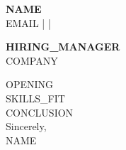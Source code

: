 \documentclass[11pt,a4paper]{article}
\begin{document}
{\Large \textbf{{{NAME}}}}\\
{{EMAIL}} \quad |  \quad | \\
\vspace{12pt}

{\bf {{HIRING_MANAGER}}}\\
{{COMPANY}}\\
\vspace{8pt}

{{OPENING}}\\[6pt]
{{SKILLS_FIT}}\\[6pt]
{{CONCLUSION}}\\[10pt]

Sincerely,\\[6pt]
{{NAME}}
\end{document}
